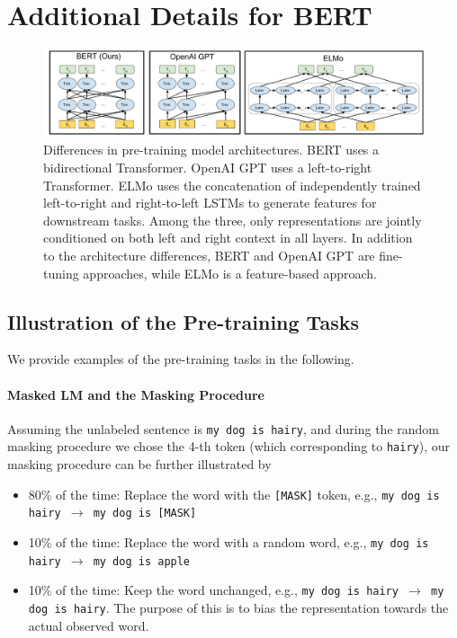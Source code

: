 \section{Additional Details for BERT}
\label{appendix:sec:bert_description}



\begin{figure}[ht]
\begin{center}
\includegraphics[width=\textwidth]{BERT_comparisons.pdf}
\end{center}
\caption{Differences in pre-training model architectures. BERT uses a bidirectional Transformer. OpenAI GPT uses a left-to-right Transformer. ELMo uses the concatenation of independently trained left-to-right and right-to-left LSTMs to generate features for downstream tasks. Among the three, only \bert representations are jointly conditioned on both left and right context in all layers. In addition to the architecture differences, BERT and OpenAI GPT are fine-tuning approaches, while ELMo is a feature-based approach.}
\label{fig:BERT_comparisons}
\end{figure}


\subsection{Illustration of the Pre-training Tasks}
We provide examples of the pre-training tasks in the following.

\paragraph{Masked LM and the Masking Procedure} 

Assuming the unlabeled sentence is {\tt {\small my dog is hairy}}, 
and during the random masking procedure we chose the 4-th token (which corresponding to {\tt {\small hairy}}), our masking procedure
can be further illustrated by
\begin{itemize}
\item 80\% of the time: Replace the word with the {\tt [MASK]} token, e.g., {\tt {\small my dog is hairy $\rightarrow$ my dog is [MASK]}}
\item 10\% of the time: Replace the word with a random word, e.g., {\tt {\small my dog is hairy $\rightarrow$ my dog is apple}}
\item 10\% of the time: Keep the word unchanged, e.g., {\tt {\small my dog is hairy $\rightarrow$ my dog is hairy}}. The purpose of this is to bias the representation towards the actual observed word.
\end{itemize}

